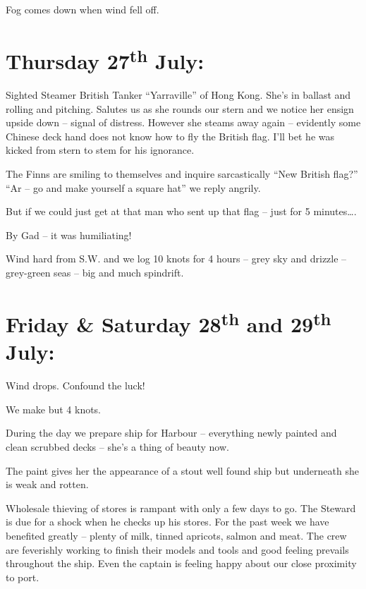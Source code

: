 \documentclass[
  11pt,
  msmallroyalvopaper
]{memoir}
\begin{document}
Fog comes down when wind fell off.

\hypertarget{thursday-27th-july}{%
\section{\texorpdfstring{Thursday 27\textsuperscript{th}
July:}{Thursday 27th July:}}\label{thursday-27th-july}}

Sighted Steamer British Tanker ``Yarraville'' of Hong Kong. She's in
ballast and rolling and pitching. Salutes us as she rounds our stern and
we notice her ensign upside down -- signal of distress. However she
steams away again -- evidently some Chinese deck hand does not know how
to fly the British flag. I'll bet he was kicked from stern to stem for
his ignorance.

The Finns are smiling to themselves and inquire sarcastically ``New
British flag?'' ``Ar -- go and make yourself a square hat'' we reply
angrily.

But if we could just get at that man who sent up that flag -- just for 5
minutes\ldots.

By Gad -- it was humiliating!

Wind hard from S.W. and we log 10 knots for 4 hours -- grey sky and
drizzle -- grey-green seas -- big and much spindrift.

\hypertarget{friday-saturday-28th-and-29th-july}{%
\section{\texorpdfstring{Friday \& Saturday 28\textsuperscript{th} and
29\textsuperscript{th}
July:}{Friday \& Saturday 28th and 29th July:}}\label{friday-saturday-28th-and-29th-july}}

Wind drops. Confound the luck!

We make but 4 knots.

During the day we prepare ship for Harbour -- everything newly painted
and clean scrubbed decks -- she's a thing of beauty now.

The paint gives her the appearance of a stout well found ship but
underneath she is weak and rotten.

Wholesale thieving of stores is rampant with only a few days to go. The
Steward is due for a shock when he checks up his stores. For the past
week we have benefited greatly -- plenty of milk, tinned apricots,
salmon and meat. The crew are feverishly working to finish their models
and tools and good feeling prevails throughout the ship. Even the captain
is feeling happy about our close proximity to port.
\end{document}
